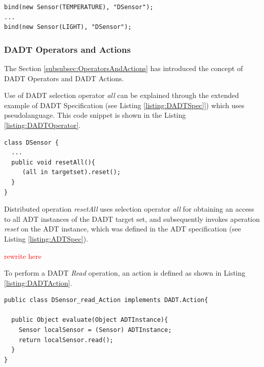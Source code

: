  
\begin{lstlisting}[frame=trbl, basewidth={0.55em, 0.6em}, captionpos=b, 
basicstyle=\ttfamily\footnotesize, breaklines, caption = Binding ADT instances to a DADT instance, label = listing:binding]
bind(new Sensor(TEMPERATURE), "DSensor");
...
bind(new Sensor(LIGHT), "DSensor");
\end{lstlisting} 


\subsubsection{DADT Operators and Actions}
\label{subsubsec:OperatorsAndActionsImpl}

The Section \ref{subsubsec:OperatorsAndActions} has introduced the
concept of DADT Operators and DADT Actions. 

Use of DADT selection operator \emph{all} can be explained through the
extended example of DADT Specification (see Listing \ref{listing:DADTSpec]})
which uses pseudolanguage. This code snippet is shown in the
Listing \ref{listing:DADTOperator}.

\begin{lstlisting}[frame=trbl, basewidth={0.55em, 0.6em}, captionpos=b, 
basicstyle=\ttfamily\footnotesize, breaklines, caption = Defining a DADT action, label = listing:DADTOperator]  
class DSensor {
  ...
  public void resetAll(){
	 (all in targetset).reset();
  }
}
\end{lstlisting}

Distributed operation \emph{resetAll} uses selection operator 
\emph{all} for obtaining an access to all ADT instances of the DADT
target set, and subsequently invokes aperation \emph{reset} on the ADT
instance, which was defined in the ADT specification (see Listing
\ref{listing:ADTSpec}).

\textcolor{red}{rewrite here }

To perform a DADT \emph{Read} operation, an action is defined
as shown in Listing
\ref{listing:DADTAction}. 
 
\begin{lstlisting}[frame=trbl, basewidth={0.55em, 0.6em}, captionpos=b, 
basicstyle=\ttfamily\footnotesize, breaklines, caption = Defining a DADT action, label = listing:DADTAction ]  
public class DSensor_read_Action implements DADT.Action{

  public Object evaluate(Object ADTInstance){
	Sensor localSensor = (Sensor) ADTInstance;
    return localSensor.read();
  }
}
\end{lstlisting}

